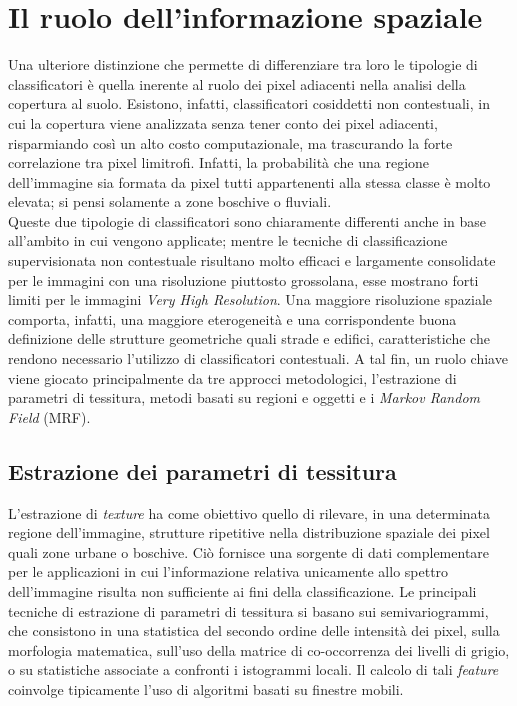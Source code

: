 \section{Il ruolo dell'informazione spaziale}

Una ulteriore distinzione che permette di differenziare tra loro le tipologie di classificatori è quella inerente al ruolo dei pixel adiacenti nella analisi della copertura al suolo. Esistono, infatti, classificatori cosiddetti non contestuali, in cui la copertura viene analizzata senza tener conto dei pixel adiacenti, risparmiando così un alto costo computazionale, ma trascurando la forte correlazione tra pixel limitrofi. Infatti, la probabilità che una regione dell'immagine sia formata da pixel tutti appartenenti alla stessa classe è molto elevata; si pensi solamente a zone boschive o fluviali. 
\\

Queste due tipologie di classificatori sono chiaramente differenti anche in base all'ambito in cui vengono applicate; mentre le tecniche di classificazione supervisionata non contestuale risultano molto efficaci e largamente consolidate per le immagini con una risoluzione piuttosto grossolana, esse mostrano forti limiti per le immagini \emph{Very High Resolution}. 
Una maggiore risoluzione spaziale comporta, infatti, una maggiore eterogeneità e una corrispondente buona definizione delle strutture geometriche quali strade e edifici, caratteristiche che rendono necessario l'utilizzo di classificatori contestuali. 
A tal fin, un ruolo chiave viene giocato principalmente da tre approcci metodologici, l'estrazione di parametri di tessitura, metodi basati su regioni e oggetti e i \emph{Markov Random Field} (MRF).


\subsection*{Estrazione dei parametri di tessitura}
L'estrazione di \emph{texture} ha come obiettivo quello di rilevare, in una determinata regione dell'immagine, strutture ripetitive nella distribuzione spaziale dei pixel quali zone urbane o boschive. 
Ciò fornisce una sorgente di dati complementare per le applicazioni in cui l'informazione relativa unicamente allo spettro dell'immagine risulta non sufficiente ai fini della classificazione. 
Le principali tecniche di estrazione di parametri di tessitura si basano sui semivariogrammi, che consistono in una statistica del secondo ordine delle intensità dei pixel, sulla morfologia matematica, sull'uso della matrice di co-occorrenza dei livelli di grigio, o su statistiche associate a confronti i istogrammi locali. Il calcolo di tali \emph{feature} coinvolge tipicamente l'uso di algoritmi basati su finestre mobili.


